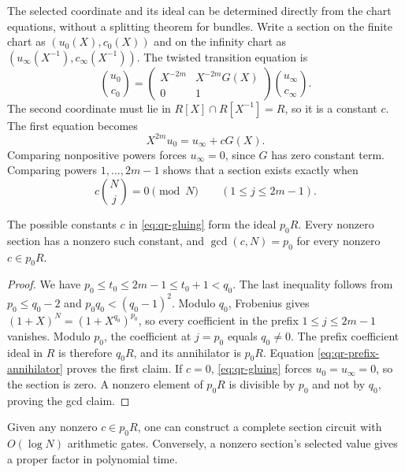 The selected coordinate and its ideal can be determined directly from
the chart equations, without a splitting theorem for bundles.
Write a section on the finite chart as $(u_0(X),c_0(X))$ and on the
infinity chart as $(u_\infty(X^{-1}),c_\infty(X^{-1}))$.
The twisted transition equation is
\[
 \binom{u_0}{c_0}
 =\begin{pmatrix}X^{-2m}&X^{-2m}G(X)\\0&1\end{pmatrix}
   \binom{u_\infty}{c_\infty}.
\]
The second coordinate must lie in
$R[X]\cap R[X^{-1}]=R$, so it is a constant $c$.
The first equation becomes
\begin{equation}
 X^{2m}u_0=u_\infty+cG(X).
 \label{eq:qr-gluing}
\end{equation}
Comparing nonpositive powers forces $u_\infty=0$, since $G$ has zero
constant term.  Comparing powers $1,\ldots,2m-1$ shows that a section
exists exactly when
\begin{equation}
 c\binom Nj=0\pmod N\qquad(1\leq j\leq2m-1).
 \label{eq:qr-prefix-annihilator}
\end{equation}

\begin{proposition}
\label{prop:qr-selected}
The possible constants $c$ in \eqref{eq:qr-gluing} form the ideal
$p_0R$.  Every nonzero section has a nonzero such constant, and
$\gcd(c,N)=p_0$ for every nonzero $c\in p_0R$.
\end{proposition}

\begin{proof}
We have
$p_0\leq t_0\leq2m-1\leq t_0+1<q_0$.
The last inequality follows from
$p_0\leq q_0-2$ and $p_0q_0<(q_0-1)^2$.
Modulo $q_0$, Frobenius gives
$(1+X)^N=(1+X^{q_0})^{p_0}$, so every coefficient in the prefix
$1\leq j\leq2m-1$ vanishes.
Modulo $p_0$, the coefficient at $j=p_0$ equals $q_0\ne0$.
The prefix coefficient ideal in $R$ is therefore $q_0R$, and its
annihilator is $p_0R$.  Equation \eqref{eq:qr-prefix-annihilator}
proves the first claim.  If $c=0$, \eqref{eq:qr-gluing} forces
$u_0=u_\infty=0$, so the section is zero.  A nonzero element of
$p_0R$ is divisible by $p_0$ and not by $q_0$, proving the gcd claim.
\end{proof}

\begin{proposition}
\label{prop:qr-section-circuit}
Given any nonzero $c\in p_0R$, one can construct a complete section
circuit with $O(\log N)$ arithmetic gates.  Conversely, a nonzero
section's selected value gives a proper factor in polynomial time.
\end{proposition}

